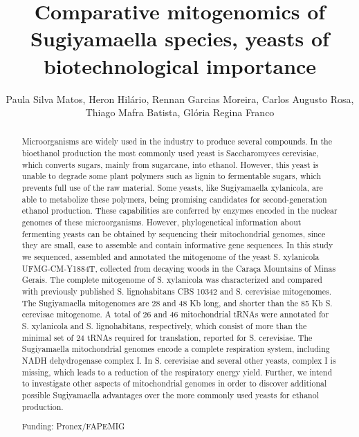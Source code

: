 \documentclass[twoside]{article}
\title{\vspace{-15mm}\fontsize{24pt}{10pt}\selectfont\textbf{ Comparative mitogenomics of Sugiyamaella species,  yeasts of biotechnological importance }} %
\author{ Paula Silva Matos, Heron Hil\'ario, Rennan Garcias Moreira, Carlos Augusto Rosa, Thiago Mafra Batista, Gl\'oria Regina Franco }
\affil{ Universidade Federal do Sul da Bahia }
\date{}
\begin{document}
  
  
  \maketitle %
  
  
  \thispagestyle{fancy} %
  
  
  \begin{abstract}
  Microorganisms are widely used in the industry to produce several compounds. In the bioethanol production the most commonly used yeast is Saccharomyces cerevisiae,  which converts sugars,  mainly from sugarcane,  into ethanol. However,  this yeast is unable to degrade some plant polymers such as lignin to fermentable sugars,  which prevents full use of the raw material. Some yeasts,  like Sugiyamaella xylanicola,  are able to metabolize these polymers,  being promising candidates for second-generation ethanol production. These capabilities are conferred by enzymes encoded in the nuclear genomes of these microorganisms. However,  phylogenetical information about fermenting yeasts can be obtained by sequencing their mitochondrial genomes,  since they are small,  ease to assemble and contain informative gene sequences. In this study we sequenced,  assembled and annotated the mitogenome of the yeast S. xylanicola UFMG-CM-Y1884T,  collected from decaying woods in the Cara\c{c}a Mountains of Minas Gerais. The complete mitogenome of S. xylanicola was characterized and compared with previously published S. lignohabitans CBS 10342 and S. cerevisiae mitogenomes. The Sugiyamaella mitogenomes are 28 and 48 Kb long,  and shorter than the 85 Kb S. cerevisae mitogenome. A total of 26 and 46 mitochondrial tRNAs were annotated for S. xylanicola and S. lignohabitans,  respectively,  which consist of more than the minimal set of 24 tRNAs required for translation,  reported for S. cerevisiae. The Sugiyamaella mitochondrial genomes encode a complete respiration system,  including NADH dehydrogenase complex I. In S. cerevisiae and several other yeasts,  complex I is missing,  which leads to a reduction of the respiratory energy yield. Further,  we intend to investigate other aspects of mitochondrial genomes in order to discover additional possible Sugiyamaella advantages over the more commonly used yeasts for ethanol production.
  
  Funding: Pronex/FAPEMIG \\ 
  \end{abstract}
  
\end{document}
